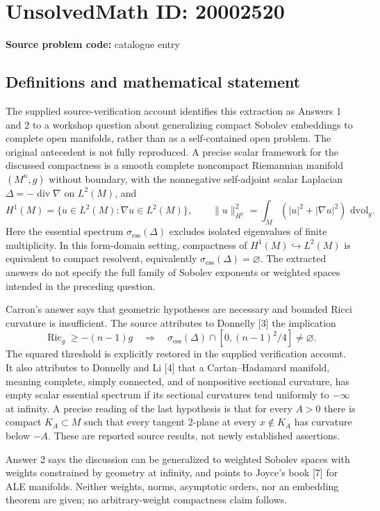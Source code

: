 \documentclass[11pt]{article}
\newcommand{\dd}{\,\mathrm{d}}
\begin{document}
\section*{UnsolvedMath ID: 20002520}
\textbf{Source problem code:} catalogue entry
\subsection{Definitions and mathematical statement}
The supplied source-verification account identifies this extraction as Answers 1 and 2 to a workshop question about generalizing compact Sobolev embeddings to complete open manifolds, rather than as a self-contained open problem. The original antecedent is not fully reproduced. A precise scalar framework for the discussed compactness is a smooth complete noncompact Riemannian manifold \((M^n,g)\) without boundary, with the nonnegative self-adjoint scalar Laplacian \(\Delta=-\operatorname{div}\nabla\) on \(L^2(M)\), and
\[
 H^1(M)=\{u\in L^2(M):\nabla u\in L^2(M)\},\qquad
 \|u\|_{H^1}^2=\int_M(|u|^2+|\nabla u|^2)\,\dd\mathrm{vol}_g.
\]
Here the essential spectrum \(\sigma_{\mathrm{ess}}(\Delta)\) excludes isolated eigenvalues of finite multiplicity. In this form-domain setting, compactness of \(H^1(M)\hookrightarrow L^2(M)\) is equivalent to compact resolvent, equivalently \(\sigma_{\mathrm{ess}}(\Delta)=\varnothing\). The extracted answers do not specify the full family of Sobolev exponents or weighted spaces intended in the preceding question.

Carron's answer says that geometric hypotheses are necessary and bounded Ricci curvature is insufficient. The source attributes to Donnelly [3] the implication
\[
 \operatorname{Ric}_g\ge-(n-1)g
 \quad\Longrightarrow\quad
 \sigma_{\mathrm{ess}}(\Delta)\cap[0,(n-1)^2/4]\ne\varnothing.
\]
The squared threshold is explicitly restored in the supplied verification account. It also attributes to Donnelly and Li [4] that a Cartan--Hadamard manifold, meaning complete, simply connected, and of nonpositive sectional curvature, has empty scalar essential spectrum if its sectional curvatures tend uniformly to \(-\infty\) at infinity. A precise reading of the last hypothesis is that for every \(A>0\) there is compact \(K_A\subset M\) such that every tangent 2-plane at every \(x\notin K_A\) has curvature below \(-A\). These are reported source results, not newly established assertions.

Answer 2 says the discussion can be generalized to weighted Sobolev spaces with weights constrained by geometry at infinity, and points to Joyce's book [7] for ALE manifolds. Neither weights, norms, asymptotic orders, nor an embedding theorem are given; no arbitrary-weight compactness claim follows.
\end{document}
